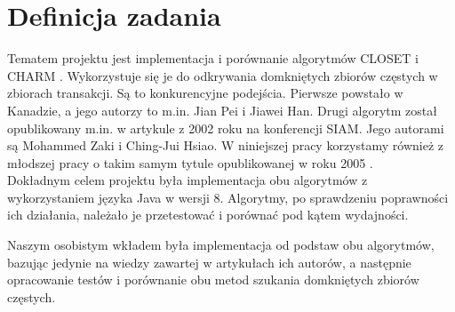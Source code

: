 \section{Definicja zadania}

Tematem projektu jest implementacja i porównanie algorytmów CLOSET \cite{closetArt} i CHARM \cite{charmArt}. Wykorzystuje się je do odkrywania domkniętych zbiorów częstych w zbiorach transakcji.
Są to konkurencyjne podejścia. Pierwsze powstało w Kanadzie, a jego autorzy to m.in. Jian Pei i Jiawei Han. Drugi algorytm został opublikowany m.in. w artykule z 2002 roku na konferencji SIAM. Jego autorami są Mohammed Zaki i Ching-Jui Hsiao. W niniejszej pracy korzystamy również z młodszej pracy o takim samym tytule opublikowanej w roku 2005 \cite{charmArt}. \\

Dokładnym celem projektu była implementacja obu algorytmów z wykorzystaniem języka Java w wersji 8. Algorytmy, po sprawdzeniu poprawności ich działania, należało je przetestować i porównać pod kątem wydajności.

Naszym osobistym wkładem była implementacja od podstaw obu algorytmów, bazując jedynie na wiedzy zawartej w artykułach ich autorów, a następnie opracowanie testów i porównanie obu metod szukania domkniętych zbiorów częstych.